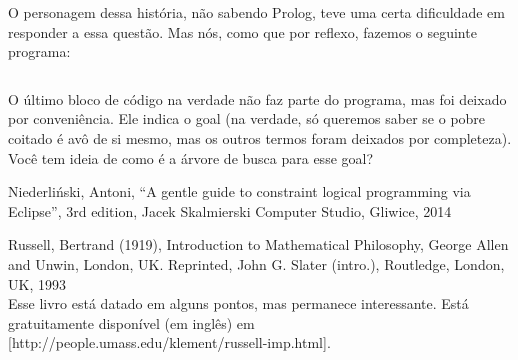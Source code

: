 \documentclass{article}
\begin{document}
O personagem dessa história, não sabendo Prolog, teve uma certa dificuldade em responder a essa
questão. Mas nós, como que por reflexo, fazemos o seguinte programa:

\inputminted{prolog}{../Exemplos/Cap5/prog1_family.pl}

O último bloco de código na verdade não faz parte do programa, mas foi deixado por conveniência. Ele
indica o goal (na verdade, só queremos saber se o pobre coitado é avô de si mesmo, mas os outros
termos foram deixados por completeza). Você tem ideia de como é a árvore de busca para esse goal?



  \begin{thebibliography}{2}

    Niederliński, Antoni,
    ``A gentle guide to constraint logical programming via Eclipse'',
    3rd edition, Jacek Skalmierski Computer Studio, Gliwice, 2014

     Russell, Bertrand (1919), Introduction to Mathematical Philosophy, George Allen and Unwin, London, UK. Reprinted, John G. Slater (intro.), Routledge, London, UK, 1993
    \\Esse livro está datado em alguns pontos, mas permanece interessante. Está gratuitamente disponível (em inglês) em [http://people.umass.edu/klement/russell-imp.html].

  \end{thebibliography}
\end{document}
